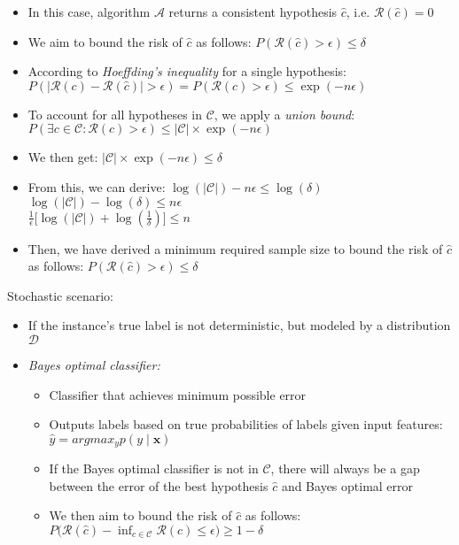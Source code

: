 \begin{itemize}
    \item In this case, algorithm $\mathcal{A}$ returns a consistent hypothesis $\hat{c}$, i.e.
    $
    \mathcal{R}(\hat{c}) = 0
    $
    \item We aim to bound the risk of $\hat{c}$ as follows:
    $
    P(\mathcal{R}(\hat{c}) > \epsilon) \leq \delta
    $
    \item According to \emph{Hoeffding's inequality} for a single hypothesis:
    $
    P(|\mathcal{R}(c) - \mathcal{R}(\hat{c})| > \epsilon) = P(\mathcal{R}(c) > \epsilon) \leq \exp(-n \epsilon)
    $
    \item To account for all hypotheses in $\mathcal{C}$, we apply a \emph{union bound}:
    $
    P(\exists c \in \mathcal{C} : \mathcal{R}(c) > \epsilon) \leq |\mathcal{C}| \times \exp(-n \epsilon)
    $
    \item We then get:
    $
    |\mathcal{C}| \times \exp(-n \epsilon) \leq \delta
    $
    \item From this, we can derive:
    $
    \log(|\mathcal{C}|) - n \epsilon \leq \log(\delta)
    $\\
    $
    \log(|\mathcal{C}|) - \log(\delta) \leq n \epsilon
    $\\
    $
    \frac{1}{\epsilon} \big[\log(|\mathcal{C}|) + \log\left(\frac{1}{\delta}\right)\big] \leq n
    $
    \item Then, we have derived a minimum required sample size to bound the risk of $\hat{c}$ as follows:
    $
    P(\mathcal{R}(\hat{c}) > \epsilon) \leq \delta
    $
\end{itemize}
Stochastic scenario:
\begin{itemize}
    \item If the instance's true label is not deterministic, but modeled by a distribution $\mathcal{D}$
    \item \emph{Bayes optimal classifier:}
    \begin{itemize}
        \item Classifier that achieves minimum possible error
        \item Outputs labels based on true probabilities of labels given input features:
        $
        \hat{y} = argmax_y p(y \mid \boldsymbol{x})
        $
        \item If the Bayes optimal classifier is not in $\mathcal{C}$, there will always be a gap between the error of the best hypothesis $\hat{c}$ and Bayes optimal error
        \item We then aim to bound the risk of $\hat{c}$ as follows:
        $
        P\big(\mathcal{R}(\hat{c}) - \inf_{c \in \mathcal{C}} \mathcal{R}(c) \leq \epsilon\big) \geq 1 - \delta
        $
    \end{itemize}
\end{itemize}
